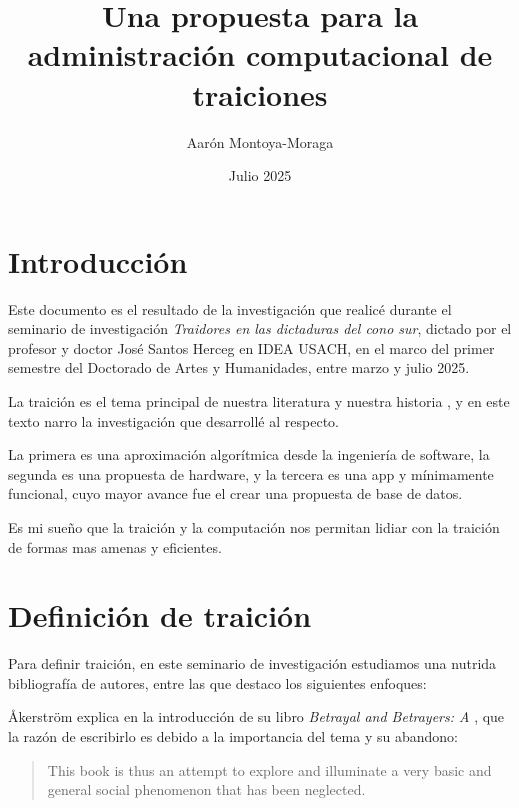 \documentclass{article}
\title{Una propuesta para la administración computacional de traiciones}
\author{Aarón Montoya-Moraga}
\date{Julio 2025}
\begin{document}
\maketitle

\renewcommand*\contentsname{Tabla de contenidos}

\tableofcontents

\clearpage

\section{Introducción}

Este documento es el resultado de la investigación que realicé durante el seminario de investigación \textit{Traidores en las dictaduras del cono sur}, dictado por el profesor y doctor José Santos Herceg en IDEA USACH, en el marco del primer semestre del Doctorado de Artes y Humanidades, entre marzo y julio 2025.

La traición es el tema principal de nuestra literatura y nuestra historia \cite[p. 138]{ordinaryVicesShklar}, y en este texto narro la investigación que desarrollé al respecto.

La primera es una aproximación algorítmica desde la ingeniería de software, la segunda es una propuesta de hardware, y la tercera es una app y mínimamente funcional, cuyo mayor avance fue el crear una propuesta de base de datos.

Es mi sueño que la traición y la computación nos permitan lidiar con la traición de formas mas amenas y eficientes.

\clearpage

\section{Definición de traición}

Para definir traición, en este seminario de investigación estudiamos una nutrida bibliografía de autores, entre las que destaco los siguientes enfoques:

Åkerström explica en la introducción de su libro \textit{Betrayal and Betrayers: A } , que la razón de escribirlo es debido a la importancia del tema y su abandono:

\begin{quote}
This book is thus an attempt to
explore and illuminate a very basic and general social phenomenon that
has been neglected.\cite[p. x]{betrayalBetrayersAkerstrom}

\end{quote}
\end{document}
